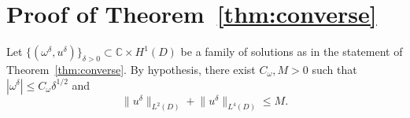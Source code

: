 \documentclass[a4paper,reqno,twoside]{amsart}
\numberwithin{equation}{section}
\theoremstyle{definition}
\newcommand{\<}{\ensuremath \leq}
\renewcommand{\>}{\ensuremath \geq}
\begin{document}


\section{Proof of Theorem~\ref{thm:converse}}

Let $\{(\omega^\delta, u^\delta)\}_{\delta > 0} \subset \mathbb{C} \times H^1(D)$
be a family of solutions as in the statement of Theorem~\ref{thm:converse}.
By hypothesis, there exist $C_\omega, M > 0$ such that
$|\omega^\delta| \leq C_\omega \delta^{1/2}$ and
\begin{equation}\label{eq:uniform_assumption}
    \lVert u^\delta \rVert_{L^2(D)}
    + \lVert u^\delta \rVert_{L^4(D)} \leq M.
\end{equation}
\end{document}
